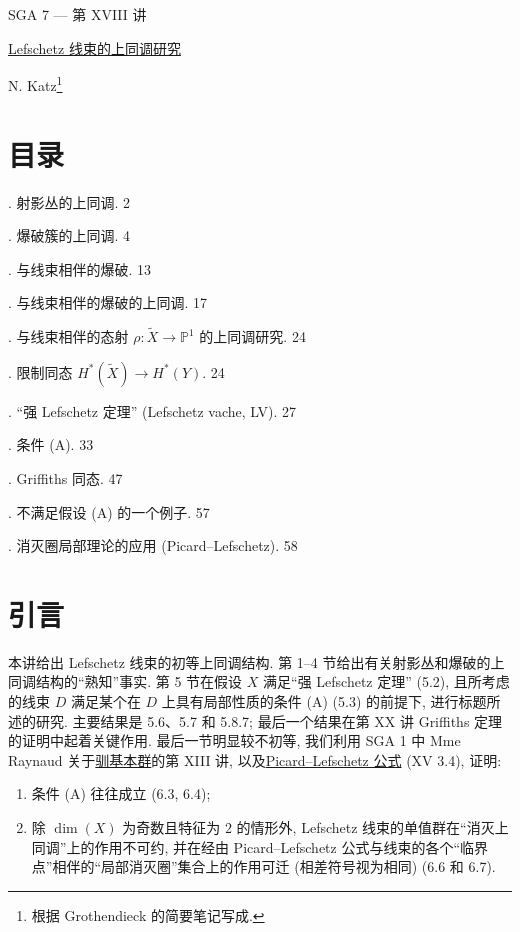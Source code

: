 \clearpage
\ExposeTOC
\begin{center}
{\large SGA 7 --- 第 XVIII 讲}\par
\vspace{2em}
{\Large\underline{Lefschetz 线束的上同调研究}}\par
\vspace{1.5em}
{\large N. Katz\footnote{根据 Grothendieck 的简要笔记写成.}}
\end{center}

\section*{目录}

. 射影丛的上同调. \hfill 2

. 爆破簇的上同调. \hfill 4

. 与线束相伴的爆破. \hfill 13

. 与线束相伴的爆破的上同调. \hfill 17

. 与线束相伴的态射 $\rho:\widetilde X\longrightarrow\mathbb P^1$ 的上同调研究.
\hfill 24

\noindent{}. 限制同态
$H^*(\widetilde X)\longrightarrow H^*(Y)$. \hfill 24

\noindent{}. “强 Lefschetz 定理” (Lefschetz vache, LV). \hfill 27

\noindent{}. 条件 (A). \hfill 33

\noindent{}. Griffiths 同态. \hfill 47

\noindent{}. 不满足假设 (A) 的一个例子.
\hfill 57

. 消灭圈局部理论的应用
(Picard--Lefschetz). \hfill 58

\section*{引言}

本讲给出 Lefschetz 线束的初等上同调结构. 第 1--4 节给出有关射影丛和爆破的上同调结构的“熟知”事实. 第 5 节在假设 $X$ 满足“强 Lefschetz 定理” (5.2), 且所考虑的线束 $D$ 满足某个在 $D$ 上具有局部性质的条件 (A) (5.3) 的前提下, 进行标题所述的研究. 主要结果是 5.6、5.7 和 5.8.7; 最后一个结果在第 XX 讲 Griffiths 定理的证明中起着关键作用. 最后一节明显较不初等, 我们利用 SGA 1 中 Mme Raynaud 关于\underline{驯基本群}的第 XIII 讲, 以及\underline{Picard--Lefschetz 公式} (XV 3.4), 证明:
\begin{enumerate}[label=(\arabic*)]
\item 条件 (A) 往往成立 (6.3, 6.4);
\item 除 $\dim(X)$ 为奇数且特征为 $2$ 的情形外, Lefschetz 线束的单值群在“消灭上同调”上的作用不可约, 并在经由 Picard--Lefschetz 公式与线束的各个“临界点”相伴的“局部消灭圈”集合上的作用可迁 (相差符号视为相同) (6.6 和 6.7).
\end{enumerate}

